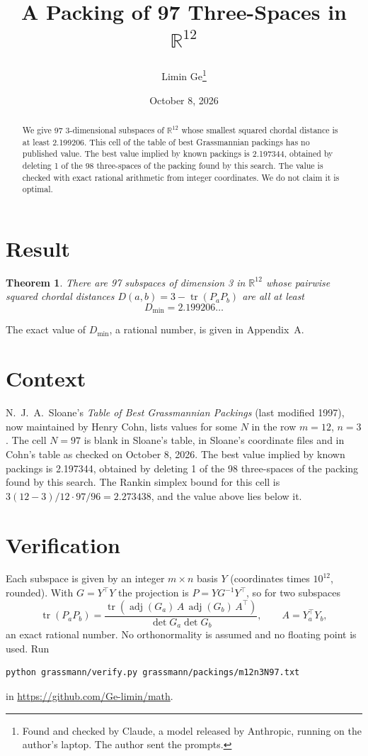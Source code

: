 \documentclass[11pt,a4paper]{article}
\title{A Packing of 97 Three-Spaces in $\mathbb{R}^{12}$}
\author{Limin Ge\thanks{Found and checked by Claude, a model released by Anthropic, running on the author's laptop. The author sent the prompts.}}
\date{October 8, 2026}
\newtheorem*{theorem}{Theorem}
\begin{document}
\maketitle
\begin{abstract}
We give 97 3-dimensional subspaces of $\mathbb{R}^{12}$ whose smallest squared chordal distance is at least 2.199206. This cell of the table of best Grassmannian packings has no published value. The best value implied by known packings is 2.197344, obtained by deleting 1 of the 98 three-spaces of the packing found by this search. The value is checked with exact rational arithmetic from integer coordinates. We do not claim it is optimal.
\end{abstract}

\section{Result}
\begin{theorem}
There are 97 subspaces of dimension 3 in $\mathbb{R}^{12}$ whose pairwise squared chordal distances $D(a,b) = 3 - \operatorname{tr}(P_aP_b)$ are all at least
\[ D_{\min} = 2.199206\ldots \]
\end{theorem}
The exact value of $D_{\min}$, a rational number, is given in Appendix~A.


\section{Context}
N.~J.~A.~Sloane's \emph{Table of Best Grassmannian Packings} (last modified 1997), now maintained by Henry Cohn, lists values for some $N$ in the row $m=12$, $n=3$. The cell $N=97$ is blank in Sloane's table, in Sloane's coordinate files and in Cohn's table as checked on October 8, 2026. The best value implied by known packings is 2.197344, obtained by deleting 1 of the 98 three-spaces of the packing found by this search. The Rankin simplex bound for this cell is $3(12-3)/12\cdot 97/96 = 2.273438$, and the value above lies below it.


\section{Verification}
Each subspace is given by an integer $m\times n$ basis $Y$ (coordinates times $10^{12}$, rounded). With $G=Y^\top Y$ the projection is $P=YG^{-1}Y^\top$, so for two subspaces
\[ \operatorname{tr}(P_aP_b)=\frac{\operatorname{tr}(\operatorname{adj}(G_a)\,A\,\operatorname{adj}(G_b)\,A^\top)}{\det G_a\det G_b},\qquad A=Y_a^\top Y_b, \]
an exact rational number. No orthonormality is assumed and no floating point is used. Run
\begin{verbatim}
python grassmann/verify.py grassmann/packings/m12n3N97.txt
\end{verbatim}
in \url{https://github.com/Ge-limin/math}.
\end{document}
